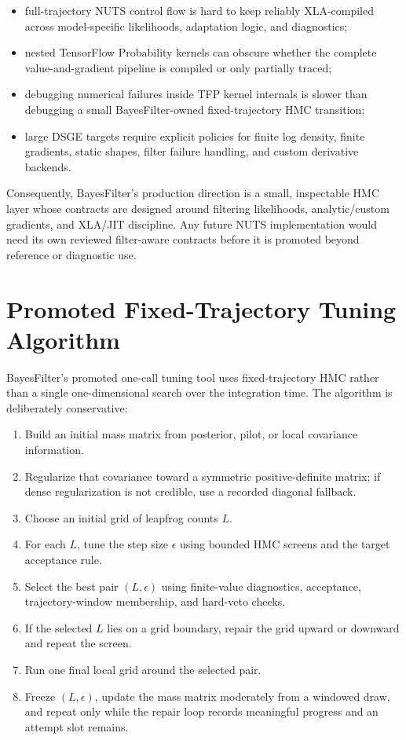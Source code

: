 \begin{itemize}
  \item full-trajectory NUTS control flow is hard to keep reliably XLA-compiled
    across model-specific likelihoods, adaptation logic, and diagnostics;
  \item nested TensorFlow Probability kernels can obscure whether the complete
    value-and-gradient pipeline is compiled or only partially traced;
  \item debugging numerical failures inside TFP kernel internals is slower than
    debugging a small BayesFilter-owned fixed-trajectory HMC transition;
  \item large DSGE targets require explicit policies for finite log density,
    finite gradients, static shapes, filter failure handling, and custom
    derivative backends.
\end{itemize}

Consequently, BayesFilter's production direction is a small, inspectable HMC
layer whose contracts are designed around filtering likelihoods,
analytic/custom gradients, and XLA/JIT discipline. Any future NUTS
implementation would need its own reviewed filter-aware contracts before it is
promoted beyond reference or diagnostic use.

\section{Promoted Fixed-Trajectory Tuning Algorithm}
\label{sec:bf-promoted-fixed-trajectory-hmc-tuning}

BayesFilter's promoted one-call tuning tool uses fixed-trajectory HMC rather
than a single one-dimensional search over the integration time.  The algorithm
is deliberately conservative:

\begin{enumerate}
  \item Build an initial mass matrix from posterior, pilot, or local covariance
    information.
  \item Regularize that covariance toward a symmetric positive-definite matrix;
    if dense regularization is not credible, use a recorded diagonal fallback.
  \item Choose an initial grid of leapfrog counts \(L\).
  \item For each \(L\), tune the step size \(\epsilon\) using bounded HMC
    screens and the target acceptance rule.
  \item Select the best pair \((L,\epsilon)\) using finite-value diagnostics,
    acceptance, trajectory-window membership, and hard-veto checks.
  \item If the selected \(L\) lies on a grid boundary, repair the grid upward or
    downward and repeat the screen.
  \item Run one final local grid around the selected pair.
  \item Freeze \((L,\epsilon)\), update the mass matrix moderately from a
    windowed draw, and repeat only while the repair loop records meaningful
    progress and an attempt slot remains.
\end{enumerate}

